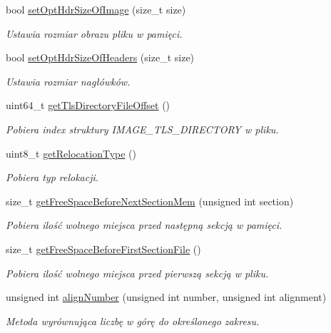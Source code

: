 \begin{DoxyCompactItemize}
bool \hyperlink{class_p_e_file_a1bd08920ea37faddc4b0c7170a4ecce6}{set\-Opt\-Hdr\-Size\-Of\-Image} (size\-\_\-t size)
\begin{DoxyCompactList}\small\item\em Ustawia rozmiar obrazu pliku w pamięci. \end{DoxyCompactList}\item 
bool \hyperlink{class_p_e_file_adc3747d33e441041a82daa16fd7fda19}{set\-Opt\-Hdr\-Size\-Of\-Headers} (size\-\_\-t size)
\begin{DoxyCompactList}\small\item\em Ustawia rozmiar nagłówków. \end{DoxyCompactList}\item 
uint64\-\_\-t \hyperlink{class_p_e_file_ae0d56760b97e3cf995d9342908821e72}{get\-Tls\-Directory\-File\-Offset} ()
\begin{DoxyCompactList}\small\item\em Pobiera index struktury I\-M\-A\-G\-E\-\_\-\-T\-L\-S\-\_\-\-D\-I\-R\-E\-C\-T\-O\-R\-Y w pliku. \end{DoxyCompactList}\item 
uint8\-\_\-t \hyperlink{class_p_e_file_aaeb99f206d194a827388098011a8a66b}{get\-Relocation\-Type} ()
\begin{DoxyCompactList}\small\item\em Pobiera typ relokacji. \end{DoxyCompactList}\item 
size\-\_\-t \hyperlink{class_p_e_file_a79d634b16a4dcbfde4631749a1e24a21}{get\-Free\-Space\-Before\-Next\-Section\-Mem} (unsigned int section)
\begin{DoxyCompactList}\small\item\em Pobiera ilość wolnego miejsca przed następną sekcją w pamięci. \end{DoxyCompactList}\item 
size\-\_\-t \hyperlink{class_p_e_file_aa89e3a9a9aa3d4bfa0e9a6f794c8bbcf}{get\-Free\-Space\-Before\-First\-Section\-File} ()
\begin{DoxyCompactList}\small\item\em Pobiera ilość wolnego miejsca przed pierwszą sekcją w pliku. \end{DoxyCompactList}\item 
unsigned int \hyperlink{class_p_e_file_afcc67325548b6b60a9f60a1807b4063b}{align\-Number} (unsigned int number, unsigned int alignment)
\begin{DoxyCompactList}\small\item\em Metoda wyrównująca liczbę w górę do określonego zakresu. \end{DoxyCompactList}\item 

\end{DoxyCompactItemize}
